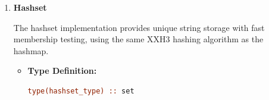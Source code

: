 \begin{enumerate}
\begin{enumerate}
\begin{itemize}
                    \item \textbf{Destroy Hashmap:} Clean up and deallocate the hashmap.
                          It is important to always call this function when the hashmap is no
                          longer in use to avoid memory leaks.
                          \begin{lstlisting}[language=Fortran]
call hashmap_destroy(map)
                          \end{lstlisting}
                          \begin{itemize}
                            \item \texttt{map}: Hashmap to destroy
                          \end{itemize}
                  \end{itemize}
                  
                  \textbf{Hashmap Usage Example:}
                  \begin{lstlisting}[language=Fortran]
use xxh3_hashmap_module

type(hashmap_type) :: gene_map
integer :: gene_index

! Create hashmap for gene IDs
call hashmap_create(gene_map, initial_size=1000)

! Store gene indices
call hashmap_put(gene_map, "Gene_001", 1)
call hashmap_put(gene_map, "Gene_002", 2)
call hashmap_put(gene_map, "Gene_003", 3)

! Lookup gene index
gene_index = hashmap_get(gene_map, "Gene_002")
! gene_index = 2

! Clean up
call hashmap_destroy(gene_map)
                  \end{lstlisting}
                  
            \item \textbf{Hashset}
                  
                  The hashset implementation provides unique string storage with fast membership
                  testing, using the same XXH3 hashing algorithm as the hashmap.
                  
                  \begin{itemize}
                    \item \textbf{Type Definition:}
                          \begin{lstlisting}[language=Fortran]
type(hashset_type) :: set
                          \end{lstlisting}
                          

\end{itemize}
\end{enumerate}
\end{enumerate}
